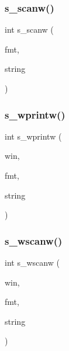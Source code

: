 \mbox{\label{C-macros_8c_a1e1dafd3d6cad8ea2d5f8609c242066e}} 
\subsubsection{\texorpdfstring{s\+\_\+scanw()}{s\_scanw()}}
{\footnotesize\ttfamily int s\+\_\+scanw (\begin{DoxyParamCaption}\item[{char $\ast$}]{fmt,  }\item[{char $\ast$}]{string }\end{DoxyParamCaption})}

\mbox{\label{C-macros_8c_a90e6df6fa68a7a58b21a763fc85a21ff}} 
\subsubsection{\texorpdfstring{s\+\_\+wprintw()}{s\_wprintw()}}
{\footnotesize\ttfamily int s\+\_\+wprintw (\begin{DoxyParamCaption}\item[{W\+I\+N\+D\+OW $\ast$}]{win,  }\item[{const char $\ast$}]{fmt,  }\item[{char $\ast$}]{string }\end{DoxyParamCaption})}

\mbox{\label{C-macros_8c_a261b2a08296fc9699afe31cc2c578410}} 
\subsubsection{\texorpdfstring{s\+\_\+wscanw()}{s\_wscanw()}}
{\footnotesize\ttfamily int s\+\_\+wscanw (\begin{DoxyParamCaption}\item[{W\+I\+N\+D\+OW $\ast$}]{win,  }\item[{char $\ast$}]{fmt,  }\item[{char $\ast$}]{string }\end{DoxyParamCaption})}

